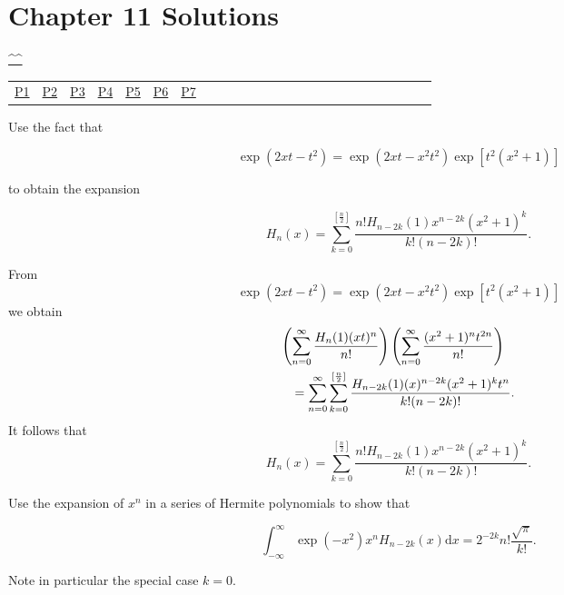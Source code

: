 \section{Chapter 11 Solutions}
\begin{center}\hyperref[toc]{\^{}\^{}}\end{center}
\begin{center}\begin{tabular}{lllllllllllllllllllllllll}
\hyperref[problem1chapter11]{P1} & \hyperref[problem2chapter11]{P2} & \hyperref[problem3chapter11]{P3} & \hyperref[problem4chapter11]{P4} & \hyperref[problem5chapter11]{P5} & \hyperref[problem6chapter11]{P6} & \hyperref[problem7chapter11]{P7}
\end{tabular}\end{center}
\setcounter{problem}{0}
\setcounter{solution}{0}
\begin{problem}\label{problem1chapter11}
Use the fact that

$$\exp(2xt-t^2) = \exp(2xt-x^2t^2) \exp[t^2(x^2+1)]$$

to obtain the expansion

$$H_n(x) = \displaystyle\sum_{k=0}^{[\frac{n}{2}]} \dfrac{n! H_{n-2k}(1) x^{n-2k}(x^2+1)^k}{k!(n-2k)!}.$$
\end{problem}
\begin{solution}
From
$$\exp(2xt-t^2) = \exp(2xt-x^2t^2)\exp[t^2(x^2+1)]$$
we obtain
\begin{eqnarray*}
\lefteqn{\left( \displaystyle\sum_{n=0}^{\infty} \dfrac{H_n(1) (xt)^n}{n!} \right) \left( \displaystyle\sum_{n=0}^{\infty} \dfrac{(x^2+1)^n t^{2n}}{n!} \right)} \\
&&= \displaystyle\sum_{n=0}^{\infty} \displaystyle\sum_{k=0}^{[\frac{n}{2}]} \dfrac{H_{n-2k}(1) (x)^{n-2k}(x^2+1)^k t^n}{k! (n-2k)!}.
\end{eqnarray*}
It follows that
$$H_n(x) = \displaystyle\sum_{k=0}^{[\frac{n}{2}]} \dfrac{n! H_{n-2k}(1) x^{n-2k} (x^2+1)^k}{k! (n-2k)!}.$$
\end{solution}
\begin{problem}\label{problem2chapter11}
Use the expansion of $x^n$ in a series of Hermite polynomials to show that

$$\displaystyle\int_{-\infty}^{\infty} \exp(-x^2)x^n H_{n-2k}(x) \mathrm{d}x = 2^{-2k}n! \dfrac{\sqrt{\pi}}{k!}.$$

Note in particular the special case $k=0$.
\end{problem}

